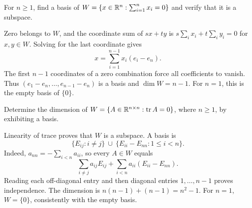 \begin{problem}\label{ex:03:zero-sum}
For \(n\geqslant1\), find a basis of
\(W=\{x\in\mathbb R^n:\sum_{i=1}^n x_i=0\}\) and verify that it is a subspace.
\end{problem}
\begin{solution}
Zero belongs to \(W\), and the coordinate sum of \(sx+ty\) is
\(s\sum_i x_i+t\sum_i y_i=0\) for \(x,y\in W\).
Solving for the last coordinate gives
\[
x=\sum_{i=1}^{n-1}x_i(e_i-e_n).
\]
The first \(n-1\) coordinates of a zero combination force all coefficients
to vanish. Thus \((e_1-e_n,\ldots,e_{n-1}-e_n)\) is a basis and
\(\dim W=n-1\). For \(n=1\), this is the empty basis of \(\{0\}\).
\end{solution}

\begin{problem}\label{ex:03:trace-zero}
Determine the dimension of \(W=\{A\in\mathbb R^{n\times n}:\operatorname{tr} A=0\}\),
where \(n\geqslant1\), by exhibiting a basis.
\end{problem}
\begin{solution}
Linearity of trace proves that \(W\) is a subspace. A basis is
\[
\{E_{ij}:i\ne j\}\ \cup\ \{E_{ii}-E_{nn}:1\leqslant i<n\}.
\]
Indeed, \(a_{nn}=-\sum_{i<n}a_{ii}\), so every \(A\in W\) equals
\[
\sum_{i\ne j}a_{ij}E_{ij}+\sum_{i<n}a_{ii}(E_{ii}-E_{nn}).
\]
Reading each off-diagonal entry and then diagonal entries \(1,\ldots,n-1\)
proves independence. The dimension is \(n(n-1)+(n-1)=n^2-1\).
For \(n=1\), \(W=\{0\}\), consistently with the empty basis.
\end{solution}

